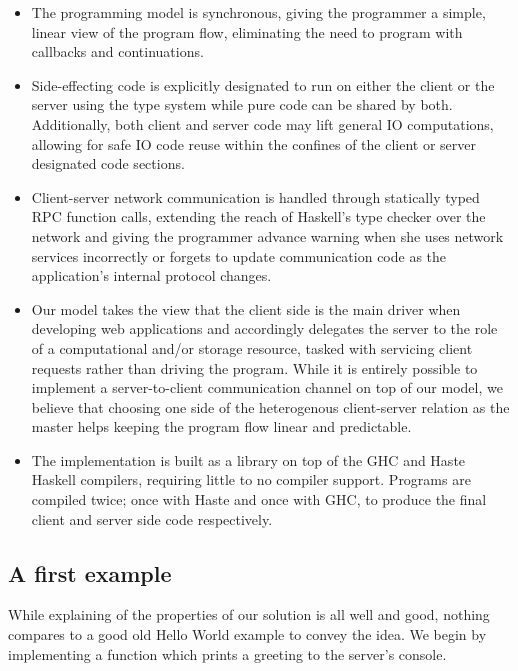 \documentclass[preprint]{sigplanconf}
\begin{document}
\begin{itemize}
  \item The programming model is synchronous, giving the programmer a simple,
        linear view of the program flow, eliminating the need to program with
        callbacks and continuations.
  \item Side-effecting code is explicitly designated to run on either the
        client or the server using the type system while pure code can be
        shared by both. Additionally, both client and server code may lift
        general IO computations, allowing for safe IO code reuse within the
        confines of the client or server designated code sections.
  \item Client-server network communication is handled through statically typed
        RPC function calls, extending the reach of Haskell's type checker over
        the network and giving the programmer advance warning when she uses
        network services incorrectly or forgets to update communication code
        as the application's internal protocol changes.
  \item Our model takes the view that the client side is the main driver when
        developing web applications and accordingly delegates the server to
        the role of a computational and/or storage resource, tasked with
        servicing client requests rather than driving the program. While it is
        entirely possible to implement a server-to-client communication channel
        on top of our model, we believe that choosing one side of the
        heterogenous client-server relation as the master helps keeping the
        program flow linear and predictable.
  \item The implementation is built as a library on top of the GHC and Haste
        Haskell compilers, requiring little to no compiler support. Programs
        are compiled twice; once with Haste and once with GHC, to produce the
        final client and server side code respectively.
\end{itemize}

\subsection{A first example}\label{sec:helloserver}

While explaining of the properties of our solution is all well and good,
nothing compares to a good old Hello World example to convey the idea.
We begin by implementing a function which prints a greeting to the server's
console.
\end{document}
